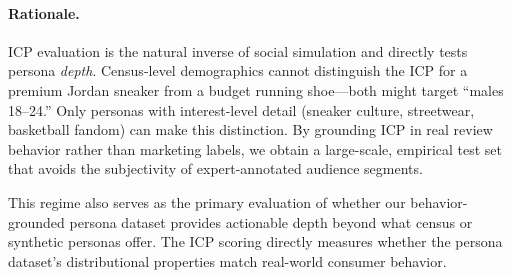 \paragraph{Rationale.}
ICP evaluation is the natural inverse of social simulation and directly tests persona \emph{depth}.
Census-level demographics cannot distinguish the ICP for a premium Jordan sneaker from a budget running shoe---both might target ``males 18--24.''
Only personas with interest-level detail (sneaker culture, streetwear, basketball fandom) can make this distinction.
By grounding ICP in real review behavior rather than marketing labels, we obtain a large-scale, empirical test set that avoids the subjectivity of expert-annotated audience segments.

This regime also serves as the primary evaluation of whether our behavior-grounded persona dataset provides actionable depth beyond what census or synthetic personas offer.
The ICP scoring directly measures whether the persona dataset's distributional properties match real-world consumer behavior.

